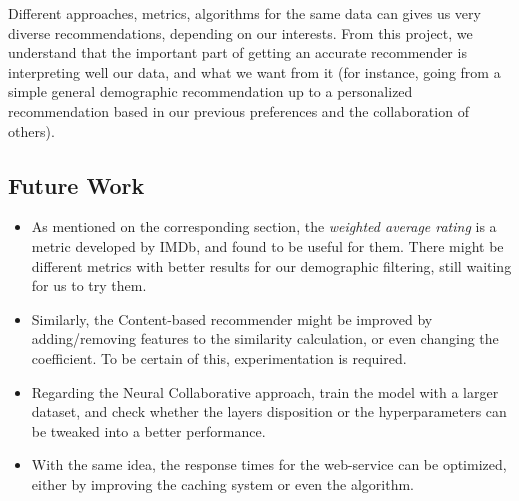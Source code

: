 Different approaches, metrics, algorithms for the same data can gives us very diverse recommendations, depending on our interests.
From this project, we understand that the important part of getting an accurate recommender is interpreting well our data, and what we want from it
(for instance, going from a simple general demographic recommendation up to a personalized recommendation based in our previous preferences and the collaboration of others).

\subsection*{Future Work}
\begin{itemize}
    \item As mentioned on the corresponding section, the \emph{weighted average rating} is a metric developed by IMDb, and found to be useful for them. There might be different metrics with better results for our demographic filtering, still waiting for us to try them.
    \item Similarly, the Content-based recommender might be improved by adding/removing features to the similarity calculation, or even changing the coefficient. To be certain of this, experimentation is required.
    \item Regarding the Neural Collaborative approach, train the model with a larger dataset, and check whether the layers disposition or the hyperparameters can be tweaked into a better performance.
    \item With the same idea, the response times for the web-service can be optimized, either by improving the caching system or even the algorithm.
\end{itemize}
